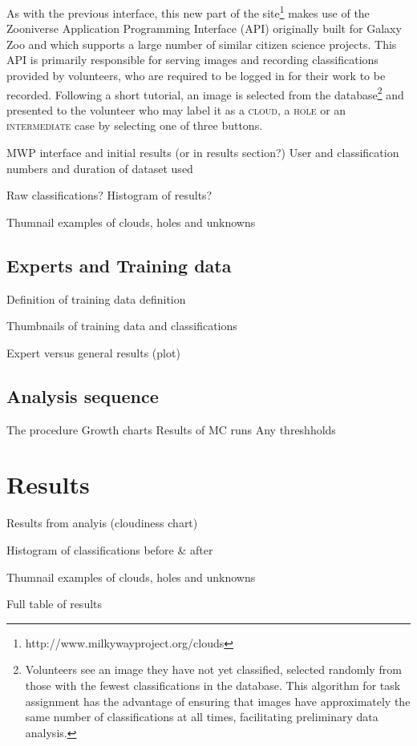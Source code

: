 \documentclass[a4,useAMS,usenatbib]{mn2e}
\begin{document}
As with the previous interface, this new part of the site\footnote{http://www.milkywayproject.org/clouds} makes use of the Zooniverse Application Programming Interface (API) originally built for Galaxy Zoo \citep{Lintottetal} and which supports a large number of similar citizen science projects. This API is primarily responsible for serving images and recording classifications provided by volunteers, who are required to be logged in for their work to be recorded. Following a short tutorial, an image is selected from the database\footnote{Volunteers see an image they have not yet classified, selected randomly from those with the fewest classifications in the database. This algorithm for task assignment has the advantage of ensuring that images have approximately the same number of classifications at all times, facilitating preliminary data analysis.} and presented to the volunteer who may label it as a \textsc{cloud}, a \textsc{hole} or an \textsc{intermediate} case by selecting one of three buttons. 

MWP interface and initial results (or in results section?)
User and classification numbers and duration of dataset used

Raw classifications?
Histogram of results?

Thumnail examples of clouds, holes and unknowns

\subsection{Experts and Training data}
Definition of training data definition

Thumbnails of training data and classifications

Expert versus general results (plot)

\subsection{Analysis sequence}
The procedure
Growth charts
Results of MC runs
Any threshholds


\section{Results}
Results from analyis (cloudiness chart)

Histogram of classifications before \& after

Thumnail examples of clouds, holes and unknowns

Full table of results
\end{document}
